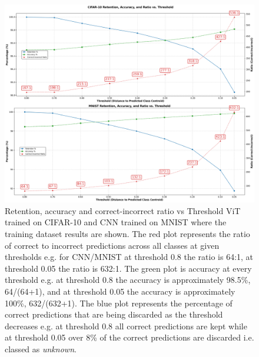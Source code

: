 \begin{figure}[ht!]
    \centering
    \includegraphics[width=0.99\columnwidth]{Figures/Results/cifar10_mnist_retention_accuracy_ratio_vs_threshold.png}
    \caption{Retention, accuracy and correct-incorrect ratio vs Threshold ViT trained on CIFAR-10 and CNN trained on MNIST where the training dataset results are shown. The red plot represents the ratio of correct to incorrect predictions across all classes at given thresholds e.g. for CNN/MNIST at threshold 0.8 the ratio is 64:1, at threshold 0.05 the ratio is 632:1. The green plot is accuracy at every threshold e.g. at threshold 0.8 the accuracy is approximately 98.5\%, 64/(64+1), and at threshold 0.05 the accuracy is approximately 100\%, 632/(632+1). The blue plot represents the percentage of correct predictions that are being discarded as the threshold decreases e.g. at threshold 0.8 all correct predictions are kept while at threshold 0.05 over 8\% of the correct predictions are discarded i.e. classed as \textit{unknown}.}
\label{fig:MNIST_TRAINING_DATASET_ACC_RATIO_VS_THRESHOLD}
\end{figure}





